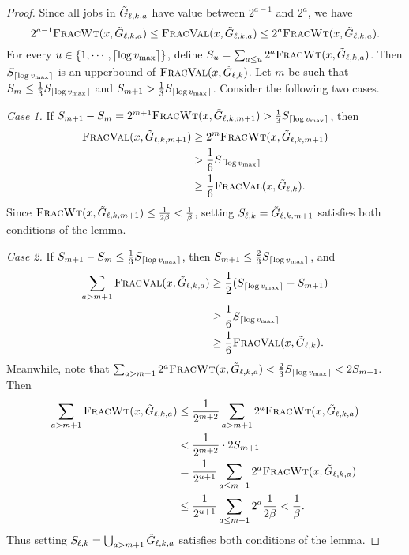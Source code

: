 \begin{proof}
    Since all jobs in ${\tilde{G}}_{\ell,k,a}$ have value between $2^{a-1}$ and $2^a$, we have
    \[
        2^{a-1}{\normalfont\textsc{FracWt}}(x, {\tilde{G}}_{\ell,k,a}) \leq{\normalfont\textsc{FracVal}}(x,{\tilde{G}}_{\ell,k,a}) \leq
            2^a{\normalfont\textsc{FracWt}}(x, {\tilde{G}}_{\ell,k,a}).
    \]
    For every $u\in\{1,\cdots,\lceil\log v_{\max}\rceil\}$, define
    $S_u=\sum_{a\leq u}2^a{\normalfont\textsc{FracWt}}(x,{\tilde{G}}_{\ell,k,a})$.  Then $S_{\lceil\log
    v_{\max}\rceil}$ is an upperbound of ${\normalfont\textsc{FracVal}}(x, {\tilde{G}}_{\ell,k})$.  Let $m$ be such that $S_m\leq
    \frac{1}{3}S_{\lceil\log v_{\max}\rceil}$ and
    $S_{m+1}>\frac{1}{3}S_{\lceil\log v_{\max}\rceil}$.  Consider the following
    two cases.

    \medskip
    {\em Case 1.} If $S_{m+1}-S_m = 2^{m+1}{\normalfont\textsc{FracWt}}(x,{\tilde{G}}_{\ell,k,m+1}) >
    \frac{1}{3}S_{\lceil\log v_{\max}\rceil}$, then
    \begin{align*}
        {\normalfont\textsc{FracVal}}(x,{\tilde{G}}_{\ell,k,m+1}) &\geq 2^{m}{\normalfont\textsc{FracWt}}(x,{\tilde{G}}_{\ell,k,m+1}) \\
            &> \frac{1}{6}S_{\lceil\log v_{\max}\rceil} \\
            &\geq\frac16 {\normalfont\textsc{FracVal}}(x,{\tilde{G}}_{\ell,k}).
    \end{align*}
    Since ${\normalfont\textsc{FracWt}}(x, {\tilde{G}}_{\ell,k,m+1})\leq \frac{1}{2\beta}<\frac{1}{\beta}$,
    setting $S_{\ell,k}={\tilde{G}}_{\ell,k,m+1}$ satisfies both conditions
    of the lemma.

    \medskip
    {\em Case 2.} If $S_{m+1}-S_m\leq \frac{1}{3}S_{\lceil\log v_{\max}\rceil}$,
    then $S_{m+1}\leq\frac{2}{3}S_{\lceil\log v_{\max}\rceil}$, and
    \begin{align*}
        \sum_{a>m+1}{\normalfont\textsc{FracVal}}(x,{\tilde{G}}_{\ell,k,a}) &\geq
                \frac{1}{2}(S_{\lceil\log v_{\max}\rceil}-S_{m+1}) \\ 
        &\geq \frac{1}{6}S_{\lceil\log v_{\max}\rceil} \\
        &\geq \frac16{\normalfont\textsc{FracVal}}(x,{\tilde{G}}_{\ell,k}).
    \end{align*}
    Meanwhile, note that
    $\sum_{a>m+1}2^a{\normalfont\textsc{FracWt}}(x,{\tilde{G}}_{\ell,k,a}) < \frac{2}{3}S_{\lceil\log
    v_{\max}\rceil} < 2S_{m+1}.$ Then
    \begin{align*}
        \sum_{a>m+1}{\normalfont\textsc{FracWt}}(x,{\tilde{G}}_{\ell,k,a}) &\leq
                \frac{1}{2^{m+2}}\sum_{a>m+1} 2^a{\normalfont\textsc{FracWt}}(x,{\tilde{G}}_{\ell,k,a}) \\
        &< \frac{1}{2^{m+2}}\cdot2S_{m+1} \\
        &= \frac{1}{2^{u+1}}\sum_{a\leq m+1}2^a{\normalfont\textsc{FracWt}}(x,{\tilde{G}}_{\ell,k,a}) \\
        &\leq \frac{1}{2^{u+1}}\sum_{a\leq m+1}2^a\frac{1}{2\beta} < \frac{1}{\beta}.
    \end{align*}
    Thus setting $S_{\ell,k}=\bigcup_{a>m+1}{\tilde{G}}_{\ell,k,a}$ satisfies
    both conditions of the lemma.
\end{proof}

